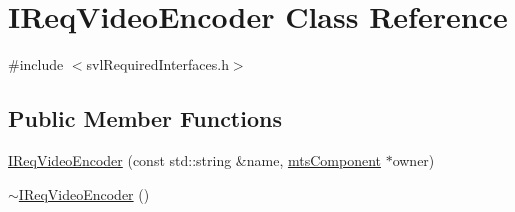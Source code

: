 \hypertarget{class_i_req_video_encoder}{\section{I\-Req\-Video\-Encoder Class Reference}
\label{class_i_req_video_encoder}
}


{\ttfamily \#include $<$svl\-Required\-Interfaces.\-h$>$}

\subsection*{Public Member Functions}
\begin{DoxyCompactItemize}
\item 
\hyperlink{class_i_req_video_encoder_ac49a7c628d6cab4933bf34d25365440c}{I\-Req\-Video\-Encoder} (const std\-::string \&name, \hyperlink{classmts_component}{mts\-Component} $\ast$owner)
\item 
\hyperlink{class_i_req_video_encoder_a37df3c177575f1547ae7e83f99da6884}{$\sim$\-I\-Req\-Video\-Encoder} ()
\end{DoxyCompactItemize}

